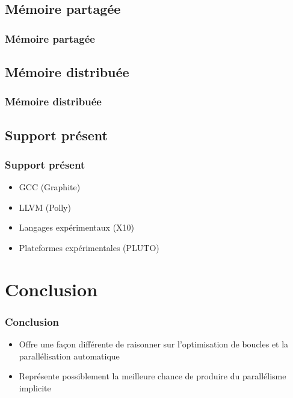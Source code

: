 \documentclass{beamer}
\begin{document}
\subsection{Mémoire partagée}
\begin{frame}
\frametitle{Mémoire partagée}

\end{frame}

\subsection{Mémoire distribuée}
\begin{frame}
\frametitle{Mémoire distribuée}

\end{frame}

\subsection{Support présent}
\begin{frame}
\frametitle{Support présent}
\begin{itemize}
\item GCC (Graphite)
\item LLVM (Polly)
\item Langages expérimentaux (X10)
\item Plateformes expérimentales (PLUTO)
\end{itemize}
\end{frame}

\section{Conclusion}
\begin{frame}
\frametitle{Conclusion}
\begin{itemize}
\item Offre une façon différente de raisonner sur l'optimisation de boucles et la parallélisation automatique
\item Représente possiblement la meilleure chance de produire du parallélisme implicite
\end{itemize}
\end{frame}
\end{document}
